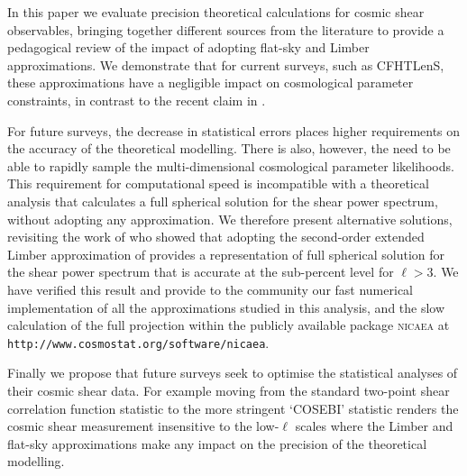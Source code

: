 In this paper we evaluate precision theoretical calculations for cosmic shear observables, bringing together different sources from the literature to provide a pedagogical review of the impact of adopting flat-sky and Limber approximations.  We demonstrate that for current surveys, such as CFHTLenS, these approximations have a negligible impact on cosmological parameter constraints, in contrast to the recent claim in \citet{2016arXiv161104954K}.  

For future surveys, the decrease in statistical errors places higher requirements on the accuracy of the theoretical modelling.    There is also, however, the need to be able to rapidly sample the multi-dimensional cosmological parameter likelihoods.  This requirement for computational speed is incompatible with a theoretical analysis that calculates a full spherical solution for the shear power spectrum, without adopting any approximation.  We therefore present alternative solutions, revisiting the work of  \citet{2012PhRvD..86b3001B} who showed that adopting the second-order extended Limber approximation of \citet{2008PhRvD..78l3506L} provides a representation of full spherical solution for the shear power spectrum that is accurate at the sub-percent level for $\ell > 3$.    We have verified this result and provide to the community our fast numerical implementation of all the approximations studied in this analysis,
and the slow calculation of the full projection within the publicly available package \textsc{nicaea} at \texttt{http://www.cosmostat.org/software/nicaea}.

Finally we propose that future surveys seek to optimise the statistical analyses of their cosmic shear data.  For example moving from the standard two-point shear correlation function statistic to the more stringent `COSEBI' statistic \citep{COSEBIs} renders the cosmic shear measurement insensitive to the low-$\ell$ scales where the Limber and flat-sky approximations make any impact on the precision of the theoretical modelling.  
